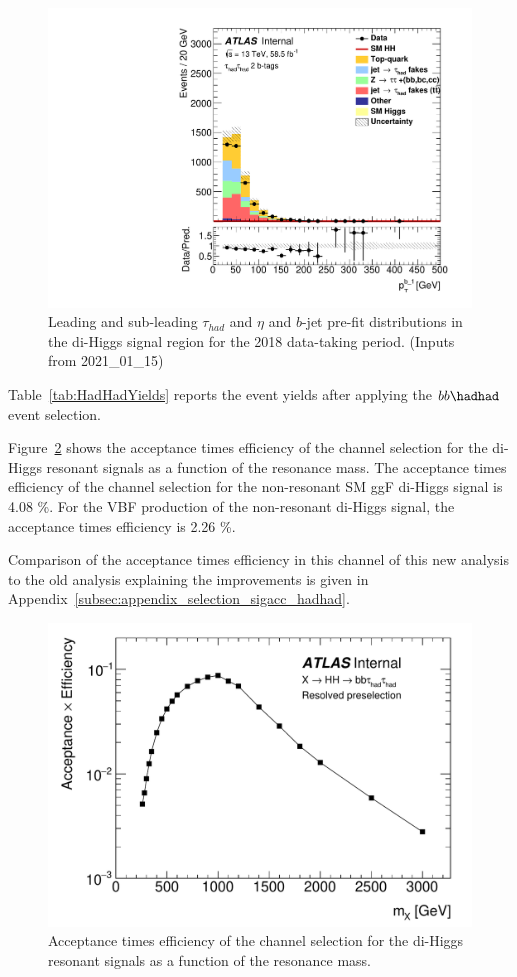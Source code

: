 \begin{figure}
\includegraphics[width=.45\textwidth]{figures/selection/HadHad_HH/Plots2018/Region_BMin0_incJet1_distJet1Pt_J2_Y2015_DLLOS_T2_SpcTauHH_L0_Prefit.pdf}
\caption{Leading and sub-leading $\tau_{had}$ \pt and $\eta$ and $b$-jet \pt pre-fit
  distributions in the di-Higgs \hadhad signal region for the 2018 data-taking period. (Inputs from 2021\_01\_15)}
\label{fig:HadHadPreselectionPtDistributions2018}
\end{figure}

Table~\ref{tab:HadHadYields} reports the event yields after applying the $bb\hadhad$ event selection.

Figure~\ref{fig:HadHadPreselectionSignalAcceptance} shows the acceptance times efficiency of the \hadhad channel selection for the di-Higgs resonant signals as a function of the resonance mass. The acceptance times efficiency of the \hadhad channel selection for the non-resonant SM ggF di-Higgs signal is 4.08 \%. For the VBF production of the non-resonant di-Higgs signal, the acceptance times efficiency is 2.26 \%.

Comparison of the acceptance times efficiency in this channel of this new analysis to the old analysis explaining the improvements is given in Appendix~\ref{subsec:appendix_selection_sigacc_hadhad}.

\begin{figure}
\centering
\includegraphics[width=.65\textwidth]{figures/selection/HadHad_HH/acc_times_eff}
\caption{Acceptance times efficiency of the \hadhad channel selection for the di-Higgs resonant signals as a function of the resonance mass.}
\label{fig:HadHadPreselectionSignalAcceptance}
\end{figure}


